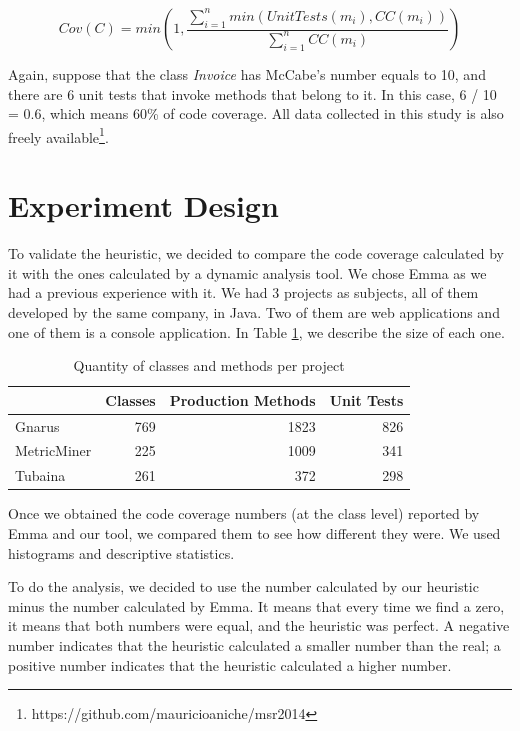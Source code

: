 \documentclass{sig-alternate}
\begin{document}
\begin{equation}
\label{formula-doida}
Cov(C) = min(1,\frac{\sum_{i=1}^{n}min(UnitTests(m_i), CC(m_i))}{\sum_{i=1}^{n}{CC(m_i)}})
\end{equation}

Again, suppose that the class \textit{Invoice} has McCabe's number equals to 10, 
and there are 6 unit tests that invoke methods that belong to it. 
In this case, 6 / 10 = 0.6, which means 60\% of code coverage.
All data collected in this study is also freely available\footnote{https://github.com/mauricioaniche/msr2014}.

\section{Experiment Design}
\label{sec-experiment}

To validate the heuristic, we decided to compare the code coverage calculated by it with the ones 
calculated by a dynamic analysis tool. We chose Emma as we had a previous experience with it. We
had 3 projects as subjects, all of them developed by the same company, in Java. Two of them are
web applications and one of them is a console application. In Table \ref{tab:projects}, we describe
the size of each one.

\begin{table}[h!]
\centering
\caption{Quantity of classes and methods per project}
\begin{tabular}{ | l | r | r | r | }
\hline
& Classes & Production Methods & Unit Tests\\ 
\hline
Gnarus & 769 & 1823 & 826\\ 
MetricMiner & 225 & 1009 & 341\\ 
Tubaina & 261 & 372 & 298\\ 

\hline
\end{tabular}
\label{tab:projects}
\end{table}

Once we obtained the code coverage numbers (at the class level) reported by Emma and our tool, 
we compared them to see how different they were. We used histograms and descriptive statistics. 

To do the analysis, we decided to use the number calculated by our heuristic minus the
number calculated by Emma. It means that every time we find a zero, it means that both numbers
were equal, and the heuristic was perfect. A negative number indicates that the heuristic calculated
a smaller number than the real; a positive number indicates that the heuristic calculated a higher
number.
\end{document}

